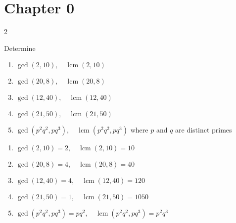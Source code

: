 \section*{Chapter 0}

\begin{hwproblem}
{2}{
    Determine
    \begin{enumerate}[label=\alph*.]
        \item $\operatorname{gcd}(2,10), \quad \operatorname{lcm}(2,10)$
        \item $\operatorname{gcd}(20,8), \quad \operatorname{lcm}(20,8)$
        \item $\operatorname{gcd}(12,40), \quad \operatorname{lcm}(12,40)$
        \item $\operatorname{gcd}(21,50), \quad \operatorname{lcm}(21,50)$
        \item $\operatorname{gcd}\left(p^2 q^2, p q^3\right), \quad \operatorname{lcm}\left(p^2 q^2, p q^3\right)$ where $p$ and $q$ are distinct primes
    \end{enumerate}
}

\begin{enumerate}[label=\alph*.]
    \item $\operatorname{gcd}(2,10) = 2, \quad \operatorname{lcm}(2,10) = 10$
    \item $\operatorname{gcd}(20,8) = 4, \quad \operatorname{lcm}(20,8) = 40$
    \item $\operatorname{gcd}(12,40) = 4, \quad \operatorname{lcm}(12,40) = 120$
    \item $\operatorname{gcd}(21,50) = 1, \quad \operatorname{lcm}(21,50) = 1050$
    \item $\operatorname{gcd}\left(p^2 q^2, p q^3\right) = pq^2, \quad \operatorname{lcm}\left(p^2 q^2, p q^3\right) = p^2 q^3$
\end{enumerate}
\end{hwproblem}

